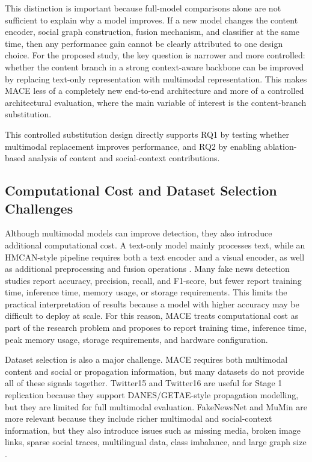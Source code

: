 This distinction is important because full-model comparisons alone are not sufficient to explain why a model improves. If a new model changes the content encoder, social graph construction, fusion mechanism, and classifier at the same time, then any performance gain cannot be clearly attributed to one design choice. For the proposed study, the key question is narrower and more controlled: whether the content branch in a strong context-aware backbone can be improved by replacing text-only representation with multimodal representation. This makes MACE less of a completely new end-to-end architecture and more of a controlled architectural evaluation, where the main variable of interest is the content-branch substitution.

This controlled substitution design directly supports RQ1 by testing whether multimodal replacement improves performance, and RQ2 by enabling ablation-based analysis of content and social-context contributions.

\subsection{Computational Cost and Dataset Selection Challenges}

Although multimodal models can improve detection, they also introduce additional computational cost. A text-only model mainly processes text, while an HMCAN-style pipeline requires both a text encoder and a visual encoder, as well as additional preprocessing and fusion operations \citep{Qian2021,Devlin2019,He2016}. Many fake news detection studies report accuracy, precision, recall, and F1-score, but fewer report training time, inference time, memory usage, or storage requirements. This limits the practical interpretation of results because a model with higher accuracy may be difficult to deploy at scale. For this reason, MACE treats computational cost as part of the research problem and proposes to report training time, inference time, peak memory usage, storage requirements, and hardware configuration.

Dataset selection is also a major challenge. MACE requires both multimodal content and social or propagation information, but many datasets do not provide all of these signals together. Twitter15 and Twitter16 are useful for Stage 1 replication because they support DANES/GETAE-style propagation modelling, but they are limited for full multimodal evaluation. FakeNewsNet and MuMin are more relevant because they include richer multimodal and social-context information, but they also introduce issues such as missing media, broken image links, sparse social traces, multilingual data, class imbalance, and large graph size \citep{shu2020fakenewsnet,mumindataset}.

